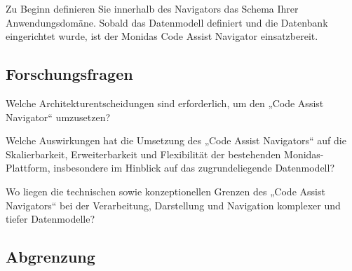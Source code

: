 Zu Beginn definieren Sie innerhalb des Navigators das Schema Ihrer Anwendungsdomäne. Sobald das Datenmodell definiert und die Datenbank eingerichtet wurde, ist der Monidas Code Assist Navigator einsatzbereit.





\subsection{Forschungsfragen}

Welche Architekturentscheidungen sind erforderlich, um den „Code Assist Navigator“ umzusetzen?

Welche Auswirkungen hat die Umsetzung des „Code Assist Navigators“ auf die Skalierbarkeit, Erweiterbarkeit und Flexibilität der bestehenden Monidas-Plattform, insbesondere im Hinblick auf das zugrundeliegende Datenmodell?

Wo liegen die technischen sowie konzeptionellen Grenzen des „Code Assist Navigators“ bei der Verarbeitung, Darstellung und Navigation komplexer und tiefer Datenmodelle?

\newpage
\subsection{Abgrenzung}


